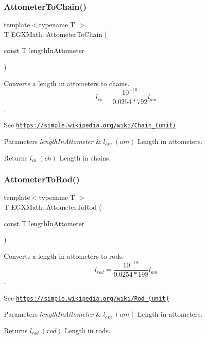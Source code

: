 \subsubsection{\texorpdfstring{Attometer\+To\+Chain()}{AttometerToChain()}}
{\footnotesize\ttfamily template$<$typename T $>$ \\
T E\+G\+X\+Math\+::\+Attometer\+To\+Chain (\begin{DoxyParamCaption}\item[{const T}]{length\+In\+Attometer }\end{DoxyParamCaption})}



Converts a length in attometers to chains. \[ l_{ch}= \frac{10^{-18}}{0.0254 * 792} l_{am} \]. 

See \href{https://simple.wikipedia.org/wiki/Chain_(unit)}{\tt https\+://simple.\+wikipedia.\+org/wiki/\+Chain\+\_\+(unit)} 
\begin{DoxyParams}{Parameters}
{\em length\+In\+Attometer} & $ l_{am}\ (am)$ Length in attometers. \\
\hline
\end{DoxyParams}
\begin{DoxyReturn}{Returns}
$ l_{ch}\ (ch)$ Length in chains. 
\end{DoxyReturn}
\mbox{\label{group___e_g_x_math-_conversions-_length_conversions-_attometer-_surveyors_ga4bdcb3e42e19c5f1ca38ee513654dfa4}} 
\subsubsection{\texorpdfstring{Attometer\+To\+Rod()}{AttometerToRod()}}
{\footnotesize\ttfamily template$<$typename T $>$ \\
T E\+G\+X\+Math\+::\+Attometer\+To\+Rod (\begin{DoxyParamCaption}\item[{const T}]{length\+In\+Attometer }\end{DoxyParamCaption})}



Converts a length in attometers to rods. \[ l_{rod}= \frac{10^{-18}}{0.0254 * 198} l_{am} \]. 

See \href{https://simple.wikipedia.org/wiki/Rod_(unit)}{\tt https\+://simple.\+wikipedia.\+org/wiki/\+Rod\+\_\+(unit)} 
\begin{DoxyParams}{Parameters}
{\em length\+In\+Attometer} & $ l_{am}\ (am)$ Length in attometers. \\
\hline
\end{DoxyParams}
\begin{DoxyReturn}{Returns}
$ l_{rod}\ (rod)$ Length in rods. 
\end{DoxyReturn}
